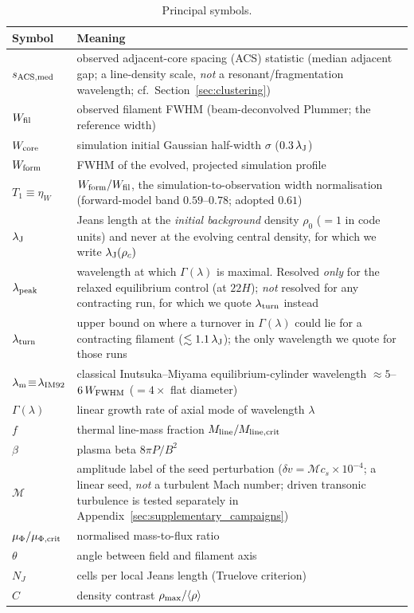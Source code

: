 \documentclass[usenatbib,twoside,twocolumn]{mnras}
\begin{document}
\begin{table}
\caption{Principal symbols.}
\label{tab:symbols}
\footnotesize
\setlength{\tabcolsep}{4pt}
\begin{tabular}{lp{6.1cm}}
\toprule
Symbol & Meaning \\
\midrule
$s_{\rm ACS,med}$ & observed adjacent-core spacing (ACS) statistic (median adjacent gap; a line-density scale, \emph{not} a resonant/fragmentation wavelength; cf.\ Section~\ref{sec:clustering}) \\
$W_{\rm fil}$ & observed filament FWHM (beam-deconvolved Plummer; the reference width) \\
$W_{\rm core}$ & simulation initial Gaussian half-width $\sigma$ ($0.3\,\lambda_{\rm J}$) \\
$W_{\rm form}$ & FWHM of the evolved, projected simulation profile \\
$T_1\!\equiv\!\eta_W$ & $W_{\rm form}/W_{\rm fil}$, the simulation-to-observation width normalisation (forward-model band $0.59$--$0.78$; adopted $0.61$) \\
$\lambda_{\rm J}$ & Jeans length at the \emph{initial background} density $\rho_0$ ($=1$ in code units) and never at the evolving central density, for which we write $\lambda_{\rm J}(\rho_c)$ \\
$\lambda_{\rm peak}$ & wavelength at which $\Gamma(\lambda)$ is maximal. Resolved \emph{only} for the relaxed equilibrium control (at $22H$); \emph{not} resolved for any contracting run, for which we quote $\lambda_{\rm turn}$ instead \\
$\lambda_{\rm turn}$ & upper bound on where a turnover in $\Gamma(\lambda)$ could lie for a contracting filament ($\lesssim1.1\,\lambda_{\rm J}$); the only wavelength we quote for those runs \\
$\lambda_{\rm m}\!\equiv\!\lambda_{\rm IM92}$ & classical Inutsuka--Miyama equilibrium-cylinder wavelength $\approx5$--$6\,W_{\rm FWHM}$ ($=4\times$ flat diameter) \\
$\Gamma(\lambda)$ & linear growth rate of axial mode of wavelength $\lambda$ \\
$f$ & thermal line-mass fraction $M_{\rm line}/M_{\rm line,crit}$ \\
$\beta$ & plasma beta $8\pi P/B^2$ \\
$\mathcal{M}$ & amplitude label of the seed perturbation ($\delta v=\mathcal{M}c_s\times10^{-4}$; a linear seed, \emph{not} a turbulent Mach number; driven transonic turbulence is tested separately in Appendix~\ref{sec:supplementary_campaigns}) \\
$\mu_\Phi/\mu_{\Phi,\rm crit}$ & normalised mass-to-flux ratio \\
$\theta$ & angle between field and filament axis \\
$N_J$ & cells per local Jeans length (Truelove criterion) \\
$C$ & density contrast $\rho_{\rm max}/\langle\rho\rangle$ \\
\bottomrule
\end{tabular}
\end{table}
\end{document}
